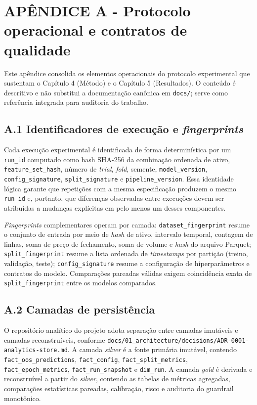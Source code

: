 \appendix

\chapter*{APÊNDICE A - Protocolo operacional e contratos de qualidade}

Este apêndice consolida os elementos operacionais do protocolo experimental que sustentam o Capítulo 4 (Método) e o Capítulo 5 (Resultados). O conteúdo é descritivo e não substitui a documentação canônica em \texttt{docs/}; serve como referência integrada para auditoria do trabalho.

\section*{A.1 Identificadores de execução e \textit{fingerprints}}

Cada execução experimental é identificada de forma determinística por um \texttt{run\_id} computado como hash SHA-256 da combinação ordenada de ativo, \texttt{feature\_set\_hash}, número de \textit{trial}, \textit{fold}, semente, \texttt{model\_version}, \texttt{config\_signature}, \texttt{split\_signature} e \texttt{pipeline\_version}. Essa identidade lógica garante que repetições com a mesma especificação produzem o mesmo \texttt{run\_id} e, portanto, que diferenças observadas entre execuções devem ser atribuídas a mudanças explícitas em pelo menos um desses componentes.

\textit{Fingerprints} complementares operam por camada: \texttt{dataset\_fingerprint} resume o conjunto de entrada por meio de \textit{hash} de ativo, intervalo temporal, contagem de linhas, soma de preço de fechamento, soma de volume e \textit{hash} do arquivo Parquet; \texttt{split\_fingerprint} resume a lista ordenada de \textit{timestamps} por partição (treino, validação, teste); \texttt{config\_signature} resume a configuração de hiperparâmetros e contratos do modelo. Comparações pareadas válidas exigem coincidência exata de \texttt{split\_fingerprint} entre os modelos comparados.

\section*{A.2 Camadas de persistência}

O repositório analítico do projeto adota separação entre camadas imutáveis e camadas reconstruíveis, conforme \texttt{docs/01\_architecture/decisions/ADR-0001-analytics-store.md}. A camada \textit{silver} é a fonte primária imutável, contendo \texttt{fact\_oos\_predictions}, \texttt{fact\_config}, \texttt{fact\_split\_metrics}, \texttt{fact\_epoch\_metrics}, \texttt{fact\_run\_snapshot} e \texttt{dim\_run}. A camada \textit{gold} é derivada e reconstruível a partir do \textit{silver}, contendo as tabelas de métricas agregadas, comparações estatísticas pareadas, calibração, risco e auditoria do guardrail monotônico.

